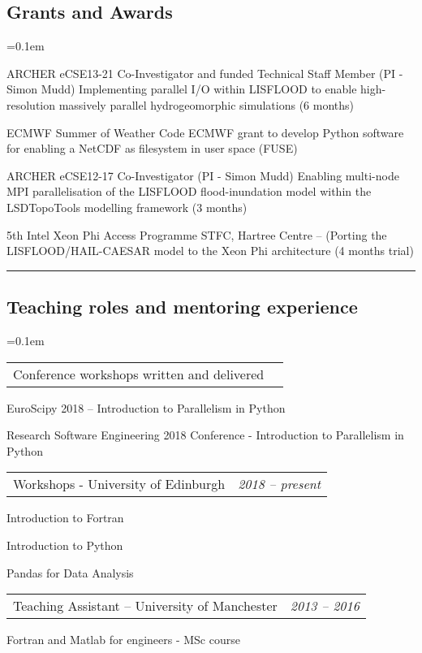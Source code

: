 \documentclass[10.5pt,a4]{article}
\makeatletter
\newcommand{\headerrow}[2]
{\begin{tabular*}{\linewidth}{l@{\extracolsep{\fill}}r}
	#1 &
	#2 \\
\end{tabular*}}
\makeatother
\begin{document}
\subsection*{Grants and Awards}
	\parskip=0.1em
\begin{itemize*}
	\item 
	  {ARCHER eCSE13-21 Co-Investigator and funded Technical Staff Member (PI - Simon Mudd)}
	  {Implementing parallel I/O within LISFLOOD to enable high-resolution massively parallel hydrogeomorphic simulations (6  months)}
	  
	\item 
	  {ECMWF Summer of Weather Code}
	  {ECMWF grant to develop Python software for enabling a NetCDF as filesystem in user space (FUSE)}

	\item 
	  {ARCHER eCSE12-17 Co-Investigator (PI - Simon Mudd)}
	  {Enabling multi-node MPI parallelisation of the LISFLOOD flood-inundation model within the LSDTopoTools modelling framework (3  months) }

	\item 
	  {5th Intel Xeon Phi Access Programme}
	  {STFC, Hartree Centre -- (Porting the LISFLOOD/HAIL-CAESAR model to the Xeon Phi architecture (4 months trial)}


\end{itemize*}

\hrule
\vspace{-0.4em}
\subsection*{Teaching roles and mentoring experience} 
	\parskip=0.1em
\begin{itemize*}
	\item
	\headerrow
	{Conference workshops written and delivered}
	{}
	  \begin{itemize*}
	  \item EuroScipy 2018 -- Introduction to Parallelism in Python
	  \item Research Software Engineering 2018 Conference - Introduction to Parallelism in Python
	  \end{itemize*}

	\item
	\headerrow
	{Workshops - University of Edinburgh}
	{\textit{2018 -- present}}
	  \begin{itemize*}
	  \item Introduction to Fortran
	  \item Introduction to Python
	  \item Pandas for Data Analysis
	  \end{itemize*}


	\item
	\headerrow
	{Teaching Assistant -- University of Manchester}
	{\textit{2013 -- 2016}}
	  \begin{itemize*}
	  \item Fortran and Matlab for engineers - MSc course
	  \end{itemize*}
\end{itemize*}
\end{document}
